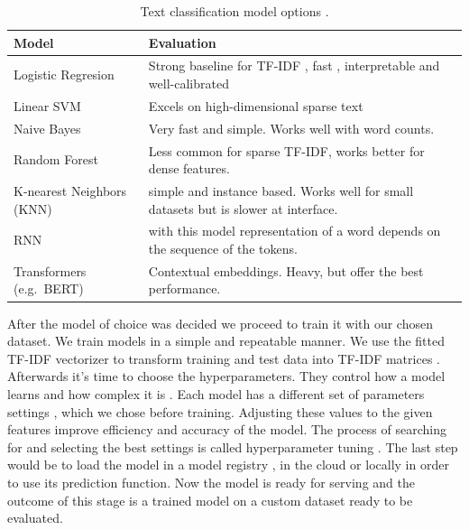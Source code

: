 \begin{table}[htbp]
  \centering
  \begin{tabularx}{\linewidth}{@{}lX@{}}
    \toprule
    \textbf{Model}            & \textbf{Evaluation}                                                                  \\
    \midrule
    Logistic Regresion        & Strong baseline for TF-IDF , fast , interpretable and well-calibrated                \\
    Linear SVM                & Excels on high-dimensional sparse text                                               \\
    Naive Bayes               & Very fast and simple. Works well with word counts.                                   \\
    Random Forest             & Less common for sparse TF-IDF, works better for dense features.                      \\
    K-nearest Neighbors (KNN) & simple and instance based. Works well for small datasets but is slower at interface. \\
    RNN                       & with this model representation of a word depends on the sequence of the tokens.      \\
    Transformers (e.g.\ BERT) & Contextual embeddings. Heavy, but offer the best performance.                        \\
    \bottomrule
  \end{tabularx}
  \caption{Text classification model options .}
  \label{tab:text_cls_models}
\end{table}

After the model of choice was decided we proceed to train it with our chosen dataset. We train models in a simple and repeatable manner. We use the fitted TF-IDF vectorizer to transform training and test data into TF-IDF matrices \cite{daud:2023}. Afterwards it's time to choose the hyperparameters. They control how a model learns and how complex it is \cite{ilemobayo:20243} . Each model has a different set of parameters settings , which we chose before training. Adjusting these values to the given features improve efficiency and accuracy of the model. The process of searching for and selecting the best settings is called hyperparameter tuning \cite{daud:2023}. The last step would be to load the model in a model registry , in the cloud or locally in order to use its prediction function. Now the model is ready for serving and the outcome of this stage is a trained model on a custom dataset ready to be evaluated.


